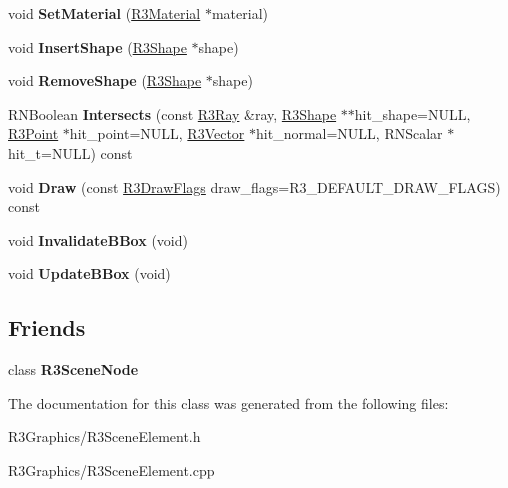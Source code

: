 \begin{DoxyCompactItemize}
\item 
void {\bfseries Set\+Material} (\hyperlink{class_r3_material}{R3\+Material} $\ast$material)\hypertarget{class_r3_scene_element_ae186b64f56620ac28402ac0cee9debbf}{}\label{class_r3_scene_element_ae186b64f56620ac28402ac0cee9debbf}

\item 
void {\bfseries Insert\+Shape} (\hyperlink{class_r3_shape}{R3\+Shape} $\ast$shape)\hypertarget{class_r3_scene_element_adfbd97fd082a146ea374599689946bee}{}\label{class_r3_scene_element_adfbd97fd082a146ea374599689946bee}

\item 
void {\bfseries Remove\+Shape} (\hyperlink{class_r3_shape}{R3\+Shape} $\ast$shape)\hypertarget{class_r3_scene_element_a6af592d96e7ad3eb838b8fba3b483554}{}\label{class_r3_scene_element_a6af592d96e7ad3eb838b8fba3b483554}

\item 
R\+N\+Boolean {\bfseries Intersects} (const \hyperlink{class_r3_ray}{R3\+Ray} \&ray, \hyperlink{class_r3_shape}{R3\+Shape} $\ast$$\ast$hit\+\_\+shape=N\+U\+LL, \hyperlink{class_r3_point}{R3\+Point} $\ast$hit\+\_\+point=N\+U\+LL, \hyperlink{class_r3_vector}{R3\+Vector} $\ast$hit\+\_\+normal=N\+U\+LL, R\+N\+Scalar $\ast$hit\+\_\+t=N\+U\+LL) const \hypertarget{class_r3_scene_element_abb12d2d2fd3fc397063d4def6f76a390}{}\label{class_r3_scene_element_abb12d2d2fd3fc397063d4def6f76a390}

\item 
void {\bfseries Draw} (const \hyperlink{class_r_n_flags}{R3\+Draw\+Flags} draw\+\_\+flags=R3\+\_\+\+D\+E\+F\+A\+U\+L\+T\+\_\+\+D\+R\+A\+W\+\_\+\+F\+L\+A\+GS) const \hypertarget{class_r3_scene_element_a7f1ec7be39d43d44f1e607518002fda1}{}\label{class_r3_scene_element_a7f1ec7be39d43d44f1e607518002fda1}

\item 
void {\bfseries Invalidate\+B\+Box} (void)\hypertarget{class_r3_scene_element_aa5fd633126612feeb26923aa38bf5901}{}\label{class_r3_scene_element_aa5fd633126612feeb26923aa38bf5901}

\item 
void {\bfseries Update\+B\+Box} (void)\hypertarget{class_r3_scene_element_a854aa411db8b7713c5d329a6674ce208}{}\label{class_r3_scene_element_a854aa411db8b7713c5d329a6674ce208}

\end{DoxyCompactItemize}
\subsection*{Friends}
\begin{DoxyCompactItemize}
\item 
class {\bfseries R3\+Scene\+Node}\hypertarget{class_r3_scene_element_acadbccc5aa3621a1216227e37d7b16da}{}\label{class_r3_scene_element_acadbccc5aa3621a1216227e37d7b16da}

\end{DoxyCompactItemize}


The documentation for this class was generated from the following files\+:\begin{DoxyCompactItemize}
\item 
R3\+Graphics/R3\+Scene\+Element.\+h\item 
R3\+Graphics/R3\+Scene\+Element.\+cpp\end{DoxyCompactItemize}
